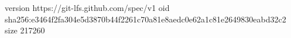version https://git-lfs.github.com/spec/v1
oid sha256:e3464f2fa304e5d3870b44f2261c70a81e8aedc0e62a1c81e2649830eabd32c2
size 217260
